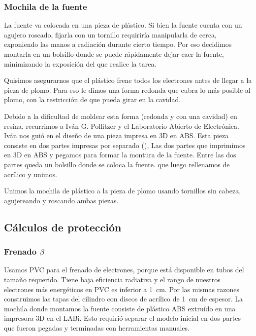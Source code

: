 \subsubsection{Mochila de la fuente}
La fuente va colocada en una pieza de plástico.
Si bien la fuente cuenta con un agujero roscado,
fijarla con un tornillo requiriría manipularla de cerca,
exponiendo las manos a radiación durante cierto tiempo.
Por eso decidimos montarla en un bolsillo donde se puede 
rápidamente dejar caer la fuente,
minimizando la exposición del que realice la tarea.

Quisimos asegurarnos que el plástico frene todos los electrones antes de llegar a
la pieza de plomo. 
Para eso le dimos una forma redonda que cubra lo más posible al plomo,
con la restricción de que pueda girar en la cavidad.

Debido a la dificultad de moldear esta forma (redonda y con una cavidad)
en resina, recurrimos a Iván G. Pollitzer y el 
Laboratorio Abierto de Electrónica.
Iván nos guió en el diseño de una pieza impresa en 3D en ABS.
Esta pieza consiste en dos partes impresas por separado
(),
{Las dos partes que imprimimos en 3D en ABS y pegamos para formar la montura de
    la fuente.
Entre las dos partes queda un bolsillo donde se coloca la fuente.}
que luego rellenamos de acrílico y unimos.

Unimos la mochila de plástico a la pieza de plomo usando tornillos sin cabeza,
agujereando y roscando ambas piezas.
\subsection{Cálculos de protección}
\subsubsection{Frenado $\beta$}
Usamos PVC para el frenado de electrones, porque está disponible en tubos
del tamaño requerido.
Tiene baja eficiencia radiativa y el rango de nuestros electrones más
energéticos en PVC es inferior a \SI{1}{\centi\meter}.
Por las mismas razones construimos las tapas del cilindro con discos de
acrílico de \SI{1}{\centi\meter} de espesor.
La mochila donde montamos la fuente consiste de plástico ABS 
extruído en una impresora 3D en el LABi.
Esto requirió separar el modelo inicial en dos partes que fueron pegadas y
terminadas con herramientas manuales.
%
